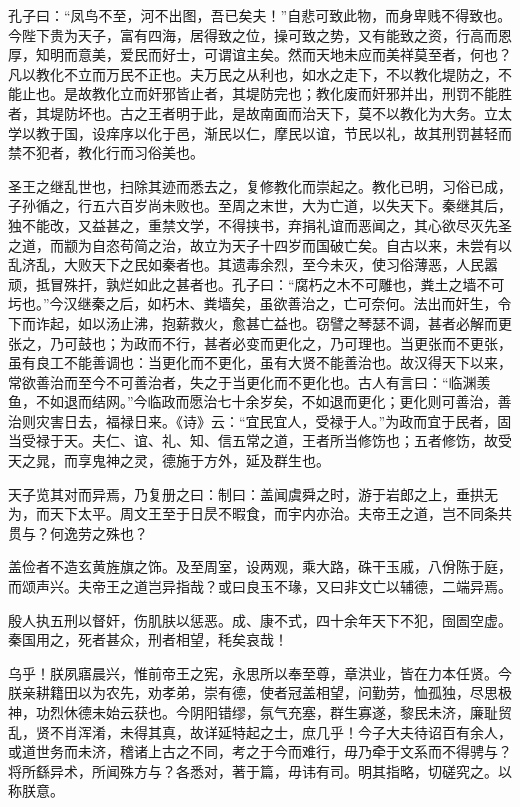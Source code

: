 \documentclass[12pt,UTF8]{ctexbook}
\begin{document}
孔子曰：“凤鸟不至，河不出图，吾已矣夫！”自悲可致此物，而身卑贱不得致也。今陛下贵为天子，富有四海，居得致之位，操可致之势，又有能致之资，行高而恩厚，知明而意美，爱民而好士，可谓谊主矣。然而天地未应而美祥莫至者，何也？凡以教化不立而万民不正也。夫万民之从利也，如水之走下，不以教化堤防之，不能止也。是故教化立而奸邪皆止者，其堤防完也；教化废而奸邪并出，刑罚不能胜者，其堤防坏也。古之王者明于此，是故南面而治天下，莫不以教化为大务。立太学以教于国，设痒序以化于邑，渐民以仁，摩民以谊，节民以礼，故其刑罚甚轻而禁不犯者，教化行而习俗美也。



圣王之继乱世也，扫除其迹而悉去之，复修教化而崇起之。教化已明，习俗已成，子孙循之，行五六百岁尚未败也。至周之末世，大为亡道，以失天下。秦继其后，独不能改，又益甚之，重禁文学，不得挟书，弃捐礼谊而恶闻之，其心欲尽灭先圣之道，而颛为自恣苟简之治，故立为天子十四岁而国破亡矣。自古以来，未尝有以乱济乱，大败天下之民如秦者也。其遗毒余烈，至今未灭，使习俗薄恶，人民嚣顽，抵冒殊扞，孰烂如此之甚者也。孔子曰：“腐朽之木不可雕也，粪土之墙不可圬也。”今汉继秦之后，如朽木、粪墙矣，虽欲善治之，亡可奈何。法出而奸生，令下而诈起，如以汤止沸，抱薪救火，愈甚亡益也。窃譬之琴瑟不调，甚者必解而更张之，乃可鼓也；为政而不行，甚者必变而更化之，乃可理也。当更张而不更张，虽有良工不能善调也：当更化而不更化，虽有大贤不能善治也。故汉得天下以来，常欲善治而至今不可善治者，失之于当更化而不更化也。古人有言曰：“临渊羡鱼，不如退而结网。”今临政而愿治七十余岁矣，不如退而更化；更化则可善治，善治则灾害日去，福禄日来。《诗》云：“宜民宜人，受禄于人。”为政而宜于民者，固当受禄于天。夫仁、谊、礼、知、信五常之道，王者所当修饬也；五者修饬，故受天之晁，而享鬼神之灵，德施于方外，延及群生也。



天子览其对而异焉，乃复册之曰：制曰：盖闻虞舜之时，游于岩郎之上，垂拱无为，而天下太平。周文王至于日昃不暇食，而宇内亦治。夫帝王之道，岂不同条共贯与？何逸劳之殊也？



盖俭者不造玄黄旌旗之饰。及至周室，设两观，乘大路，硃干玉戚，八佾陈于庭，而颂声兴。夫帝王之道岂异指哉？或曰良玉不瑑，又曰非文亡以辅德，二端异焉。



殷人执五刑以督奸，伤肌肤以惩恶。成、康不式，四十余年天下不犯，囹圄空虚。秦国用之，死者甚众，刑者相望，秏矣哀哉！



乌乎！朕夙寤晨兴，惟前帝王之宪，永思所以奉至尊，章洪业，皆在力本任贤。今朕亲耕籍田以为农先，劝孝弟，崇有德，使者冠盖相望，问勤劳，恤孤独，尽思极神，功烈休德未始云获也。今阴阳错缪，氛气充塞，群生寡遂，黎民未济，廉耻贸乱，贤不肖浑淆，未得其真，故详延特起之士，庶几乎！今子大夫待诏百有余人，或道世务而未济，稽诸上古之不同，考之于今而难行，毋乃牵于文系而不得骋与？将所繇异术，所闻殊方与？各悉对，著于篇，毋讳有司。明其指略，切磋究之。以称朕意。
\end{document}
